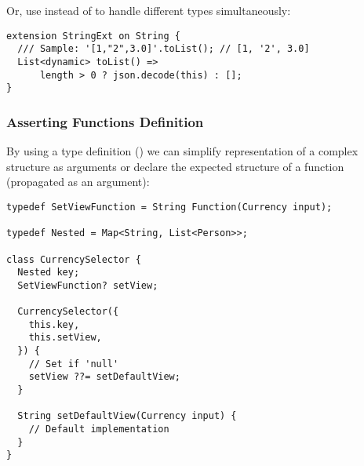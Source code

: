 \noindent Or, use  instead of  to handle different types simultaneously:

\begin{lstlisting}
extension StringExt on String {
  /// Sample: '[1,"2",3.0]'.toList(); // [1, '2', 3.0] 
  List<dynamic> toList() =>
      length > 0 ? json.decode(this) : [];
}
\end{lstlisting}


\subsubsection{Asserting Functions Definition}

By using a type definition () we can simplify representation of a complex structure as arguments or 
declare the expected structure of a function (propagated as an argument):

\begin{lstlisting}
typedef SetViewFunction = String Function(Currency input);

typedef Nested = Map<String, List<Person>>;

class CurrencySelector {
  Nested key;
  SetViewFunction? setView;

  CurrencySelector({
    this.key,
    this.setView,
  }) {
    // Set if 'null'
    setView ??= setDefaultView;
  }

  String setDefaultView(Currency input) {
    // Default implementation
  }
}
\end{lstlisting}
